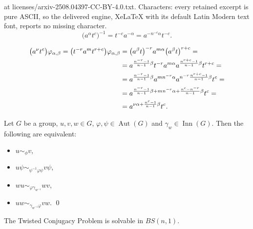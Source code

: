 \documentclass[10pt,a4paper]{amsart}
\newcommand{\Aut}{\operatorname{Aut}}
\newcommand{\Inn}{\operatorname{Inn}}
\begin{document}
at licenses/arxiv-2508.04397-CC-BY-4.0.txt. Characters: every retained excerpt is pure ASCII, so the delivered engine, XeLaTeX with its default Latin Modern text font, reports no missing character.
 \begin{equation}\label{eq: inverse}
\big( a^{\alpha}t^c \big)^{-1} =t^{-c}a^{-\alpha}=a^{-n^{-c}\alpha}t^{-c}.
 \end{equation}

 \begin{align}\label{eq: action}
\big( a^{\nu}t^c \big) \varphi_{\alpha,\beta} = \big( t^{-r}a^{m}t^{r+c}\big) \varphi_{\alpha, \beta} &= \big( a^{\beta}t\big)^{-r} a^{m\alpha} \big(a^{\beta}t\big)^{r+c}= \notag \\ &= a^{\frac{n^{-r}-1}{n-1}\beta}t^{-r} a^{m\alpha} a^{\frac{n^{r+c}-1}{n-1}\beta}t^{r+c}= \notag \\ &= a^{\frac{n^{-r}-1}{n-1}\beta} a^{m n^{-r}\alpha} a^{n^{-r}\frac{n^{r+c}-1}{n-1}\beta}t^{c}= \\ &= a^{\frac{n^{-r}-1}{n-1}\beta+ m n^{-r}\alpha + \frac{n^{c}-n^{-r}}{n-1}\beta}t^{c}= \notag \\ &= a^{\nu \alpha + \frac{n^{c}-1}{n-1}\beta}t^{c}. \notag
 \end{align}

\begin{lem} \label{lem: twisted autos}
Let $G$ be a group, $u,v,w \in G$, $\varphi, \psi \in \Aut(G)$ and $\gamma_w \in \Inn(G)$. Then the following are equivalent:
 \begin{itemize}
\item[(i)] $u \sim_\phi v$,
\item[(ii)] $u \psi \sim_{\psi^{-1}\varphi\psi} v \psi$,
\item[(iii)] $wu \sim_{\varphi\gamma_{w^{-1}}} wv$, \item[(iv)] $uw \sim_{\gamma_{w^{-1}}\varphi} vw$. \hfill \qed
 \end{itemize}
\end{lem}

\begin{thm}\label{thm: main TCP}
The Twisted Conjugacy Problem is solvable in $BS(n,1)$.
\end{thm}
\end{document}
